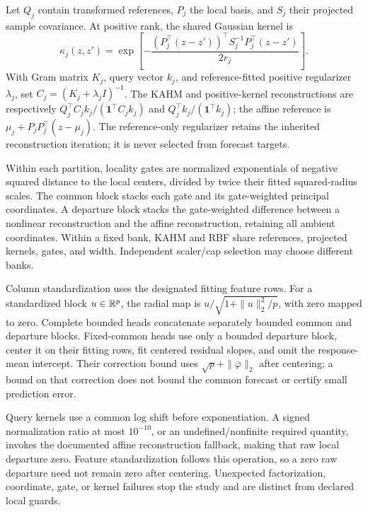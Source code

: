 Let $Q_j$ contain transformed references, $P_j$ the local basis, and
$S_j$ their projected sample covariance. At positive rank, the shared
Gaussian kernel is
\[
 \kappa_j(z,z')=
 \exp\!\left[-\frac{(P_j^\top(z-z'))^\top S_j^{-1}
                         P_j^\top(z-z')}{2r_j}\right].
\]
With Gram matrix $K_j$, query vector $k_j$, and reference-fitted positive
regularizer $\lambda_j$, set $C_j=(K_j+\lambda_jI)^{-1}$.
The KAHM and positive-kernel reconstructions are respectively
$Q_j^\top C_j k_j/(\mathbf1^\top C_jk_j)$ and
$Q_j^\top k_j/(\mathbf1^\top k_j)$; the affine reference is
$\mu_j+P_jP_j^\top(z-\mu_j)$.
The reference-only regularizer retains the inherited reconstruction
iteration; it is never selected from forecast targets.

Within each partition, locality gates are normalized exponentials of
negative squared distance to the local centers, divided by twice their
fitted squared-radius scales. The common block stacks each gate and its
gate-weighted principal coordinates. A departure block stacks the
gate-weighted difference between a nonlinear reconstruction and the
affine reconstruction, retaining all ambient coordinates. Within a fixed
bank, KAHM and RBF share references, projected kernels, gates, and width.
Independent scaler/cap selection may choose different banks.

Column standardization uses the designated fitting feature rows. For a
standardized block $u\in\mathbb{R}^p$, the radial map is
$u/\sqrt{1+\|u\|_2^2/p}$, with zero mapped to zero.
Complete bounded heads concatenate separately bounded common and
departure blocks. Fixed-common heads use only a bounded departure block,
center it on their fitting rows, fit centered residual slopes, and omit
the response-mean intercept. Their correction bound uses
$\sqrt p+\|\bar\varphi\|_2$ after centering; a bound on that correction
does not bound the common forecast or certify small prediction error.

Query kernels use a common log shift before exponentiation. A signed
normalization ratio at most $10^{-10}$, or an undefined/nonfinite required
quantity, invokes the documented affine reconstruction fallback, making
that raw local departure zero. Feature standardization follows this
operation, so a zero raw departure need not remain zero after centering.
Unexpected factorization, coordinate, gate, or kernel failures stop the
study and are distinct from declared local guards.

\begin{table}[t]
\centering\small
\caption{Frozen grids shared by the two follow-ups, except that the
new cross-fit/fold/half-training searches omit the redundant cap twenty.
Raw RBF receives three history scalers; geometric complete procedures
receive the five declared common/departure pairs. These grids do not
assert equal computation or representation width.}
\label{tab:supp-followup-grids}

\end{table}

